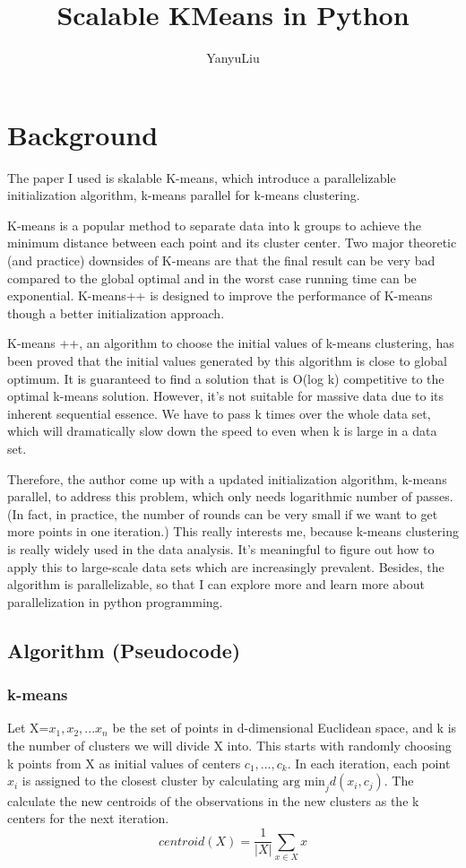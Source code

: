 \documentclass{article}
\author{YanyuLiu}
\title{Scalable KMeans in Python}
\date{\vspace{-5ex}}
\begin{document}
\maketitle
\section{Background}
The paper I used is skalable K-means, which introduce a parallelizable initialization algorithm, k-means parallel for k-means clustering.

\vspace{2 mm}
K-means is a popular method to separate data into k groups to achieve the minimum distance between each point and its cluster center. Two major theoretic (and practice) downsides of K-means are that the final result can be very bad compared to the global optimal and in the worst case running time can be exponential. K-means++ is designed to improve the performance of K-means though a better initialization approach.

\vspace{2 mm}
K-means ++, an algorithm to choose the initial values of k-means clustering, has been proved that the initial values generated by this algorithm is close to global optimum. It is guaranteed to find a solution that is O(log k) competitive to the optimal k-means solution. However, it's not suitable for massive data due to its inherent sequential essence. We have to pass k times over the whole data set, which will dramatically slow down the speed to even when k is large in a data set.

\vspace{2 mm}
Therefore, the author come up with a updated initialization algorithm, k-means parallel, to address this problem, which only needs logarithmic number of passes. (In fact, in practice, the number of rounds can be very small if we want to get more points in one iteration.) This really interests me, because k-means clustering is really widely used in the data analysis. It's meaningful to figure out how to apply this to large-scale data sets which are increasingly prevalent. Besides, the algorithm is parallelizable, so that I can explore more and learn more about parallelization in python programming.

\subsection{Algorithm (Pseudocode)}
\subsubsection{k-means}
Let X={$x_1,x_2,...x_n$} be the set of points in d-dimensional Euclidean space, and k is the number of clusters we will divide X into. This starts with randomly choosing k points from X as initial values of centers $c_1,...,c_k$. In each iteration, each point $x_i$ is assigned to the closest cluster by calculating $\text{arg min}_j d(x_i,c_j)$. The calculate the new centroids of the observations in the new clusters as the k centers for the next iteration.
$$centroid(X) = \frac{1}{|X|}\sum_{x \in X} x$$
\end{document}
